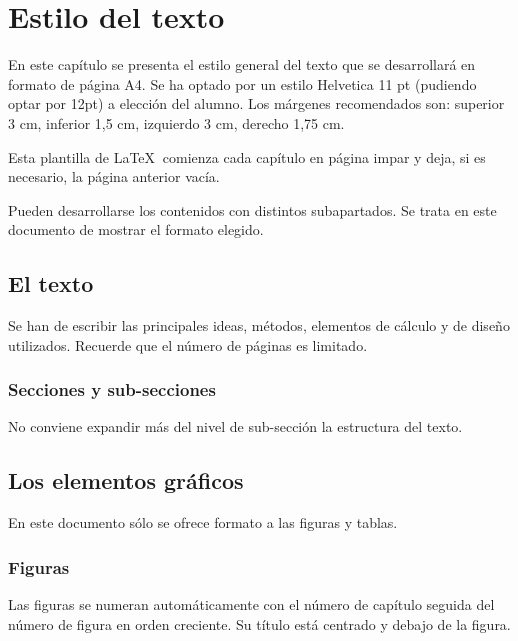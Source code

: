 \chapter{Estilo del texto}
En este capítulo se presenta el estilo general del texto que se desarrollará en formato de página A4. Se ha optado por un estilo Helvetica 11 pt (pudiendo optar por 12pt) a elección del alumno. Los márgenes recomendados son: superior 3 cm, inferior 1,5 cm, izquierdo 3 cm, derecho 1,75 cm. 

Esta plantilla de \LaTeX $ \ $ comienza cada capítulo en página impar y deja, si es necesario, la página anterior vacía.

Pueden desarrollarse los contenidos con distintos subapartados. Se trata en este documento de mostrar el formato elegido.
\section{El texto}
Se han de escribir las principales ideas, métodos, elementos de cálculo y de diseño utilizados. Recuerde que el número de páginas es limitado.
\subsection{Secciones y sub-secciones}	
No conviene expandir más del nivel de sub-sección la estructura del texto.

\section{Los elementos gráficos}
En este documento sólo se ofrece formato a las figuras y tablas.
\subsection{Figuras}
Las figuras se numeran automáticamente con el número de capítulo seguida del número de figura en orden creciente. Su título está centrado y debajo de la figura.


